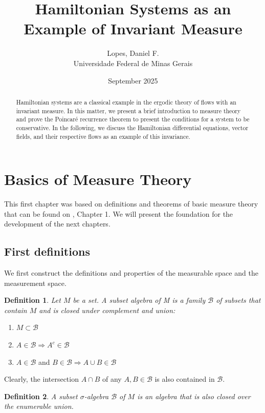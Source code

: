 \documentclass[a4paper,12pt] {article}
\title{Hamiltonian Systems as an Example of Invariant Measure}
\author{Lopes, Daniel F. \\ Universidade Federal de Minas Gerais}
\date{September 2025}
\newtheorem{definition}{Definition}[section]
\begin{document}
\maketitle

\begin{abstract}
Hamiltonian systems are a classical example in the ergodic theory of flows with an invariant measure. In this matter, we present a brief introduction to measure theory and prove the Poincaré recurrence theorem to present the conditions for a system to be conservative. In the following, we discuss the Hamiltonian differential equations, vector fields, and their respective flows as an example of this invariance.
\end{abstract}

\section{Basics of Measure Theory}

This first chapter was based on definitions and theorems of basic measure theory that can be found on \cite{Krerley}, Chapter 1. We will present the foundation for the development of the next chapters.

\subsection{First definitions}
We first construct the definitions and properties of the measurable space and the measurement space.
 
\begin{definition} Let $M$ be a set. A subset algebra of M is a family $\mathcal{B}$ of subsets that contain $M$ and is closed under complement and union:
\end{definition}

\begin{enumerate}
    \item $M \subset \mathcal{B}$
    \item $A \in \mathcal{B} \Rightarrow A^{c} \in \mathcal{B}$
    \item $A \in \mathcal{B}$ and $B \in \mathcal{B} \Rightarrow A \cup B \in \mathcal{B}$
\end{enumerate}

 Clearly, the intersection $A \cap B$ of any $A,B \in \mathcal{B}$ is also contained in $\mathcal{B}$.
 
\begin{definition}
    A subset $\sigma$-algebra $\mathcal{B}$ of $M$ is an algebra that is also closed over the enumerable union.
\end{definition}
\end{document}
